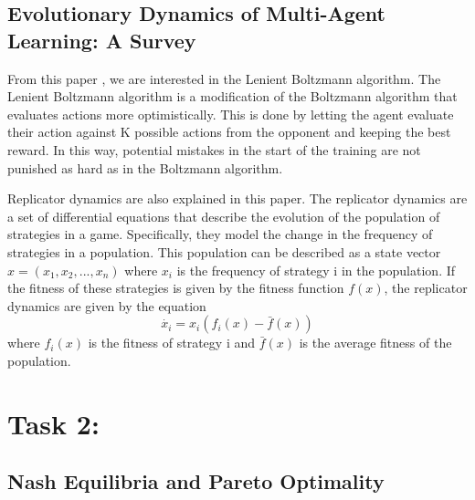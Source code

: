\documentclass[12pt,a4paper, onecolumn]{exam}
\begin{document}
\subsection{Evolutionary Dynamics of Multi-Agent Learning: A Survey}

From this paper \cite{bloembergen}, we are interested in the Lenient Boltzmann algorithm. The Lenient Boltzmann algorithm is a modification of the Boltzmann algorithm that evaluates actions more optimistically.
This is done by letting the agent evaluate their action against K possible actions from the opponent and keeping the best reward. In this way, potential mistakes in the start of the training
are not punished as hard as in the Boltzmann algorithm.

Replicator dynamics are also explained in this paper. The replicator dynamics are a set of differential equations that describe the evolution of the population of strategies in a game.
Specifically, they model the change in the frequency of strategies in a population. This population can be described as a state vector $x = (x_1, x_2, ..., x_n)$ where $x_i$ is the frequency of
strategy i in the population. If the fitness of these strategies is given by the fitness function $f(x)$, the replicator dynamics are given by the equation
\begin{equation}\label{eq:replicator}
    \dot{x_i} = x_i(f_i(x) - \bar{f}(x))
\end{equation}
where $f_i(x)$ is the fitness of strategy i and $\bar{f}(x)$ is the average fitness of the population.

\section{\textbf{Task 2:}}
\subsection{Nash Equilibria and Pareto Optimality}
\end{document}
